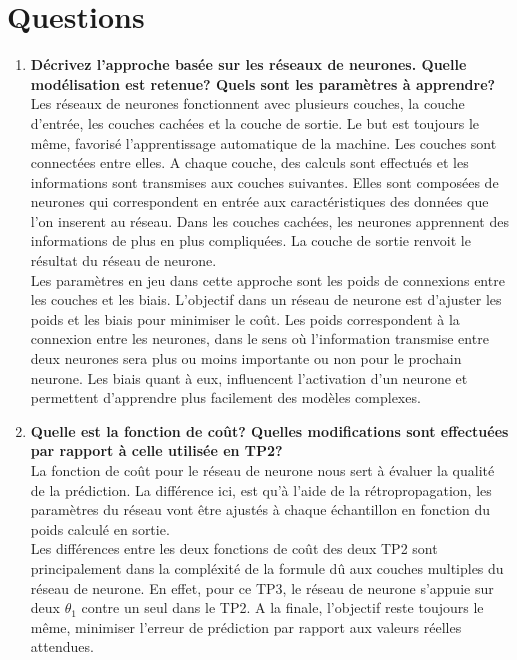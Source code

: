 \clearpage
\section{Questions}

\begin{enumerate}
    \item \textbf{Décrivez l’approche basée sur les réseaux de neurones. Quelle modélisation est retenue? Quels sont les paramètres à apprendre?}\\
    
    Les réseaux de neurones fonctionnent avec plusieurs couches, la couche d'entrée, les couches cachées et la couche de sortie.
    Le but est toujours le même, favorisé l'apprentissage automatique de la machine. Les couches sont connectées entre elles. 
    A chaque couche, des calculs sont effectués et les informations sont transmises aux couches suivantes. Elles sont composées de neurones
    qui correspondent en entrée aux caractéristiques des données que l'on inserent au réseau. Dans les couches cachées, les neurones
    apprennent des informations de plus en plus compliquées. La couche de sortie renvoit le résultat du réseau de neurone. \\

    Les paramètres en jeu dans cette approche sont les poids de connexions entre les couches et les biais. L'objectif dans un réseau
    de neurone est d'ajuster les poids et les biais pour minimiser le coût. Les poids correspondent à la connexion entre les neurones, 
    dans le sens où l'information transmise entre deux neurones sera plus ou moins importante ou non pour le prochain neurone. Les biais
    quant à eux, influencent l'activation d'un neurone et permettent d'apprendre plus facilement des modèles complexes. 


    \vspace{0.5cm}
    
    \item \textbf{Quelle est la fonction de coût? Quelles modifications sont effectuées par rapport à celle utilisée en TP2?} \\
    
    La fonction de coût pour le réseau de neurone nous sert à évaluer la qualité de la prédiction. La différence ici, est qu'à 
    l'aide de la rétropropagation, les paramètres du réseau vont être ajustés à chaque échantillon en fonction du poids calculé
    en sortie. \\

    Les différences entre les deux fonctions de coût des deux TP2 sont principalement dans la compléxité de la formule dû aux couches
    multiples du réseau de neurone. En effet, pour ce TP3, le réseau de neurone s'appuie sur deux $\theta_1$ contre un seul dans le TP2.
    A la finale, l'objectif reste toujours le même, minimiser l'erreur de prédiction par rapport aux valeurs réelles attendues. 

\end{enumerate}